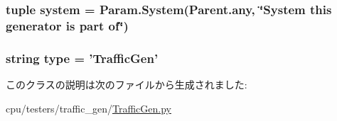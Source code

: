 \label{classTrafficGen_1_1TrafficGen_a1aadf525515ecfcf662c2aa51a503763}
\hypertarget{classTrafficGen_1_1TrafficGen_ab737471139f5a296e5b26e8a0e1b0744}{
\subsubsection[{system}]{\setlength{\rightskip}{0pt plus 5cm}tuple {\bf system} = Param.System(Parent.any, \char`\"{}System this generator is part of\char`\"{})}}
\label{classTrafficGen_1_1TrafficGen_ab737471139f5a296e5b26e8a0e1b0744}
\hypertarget{classTrafficGen_1_1TrafficGen_acce15679d830831b0bbe8ebc2a60b2ca}{
\subsubsection[{type}]{\setlength{\rightskip}{0pt plus 5cm}string {\bf type} = '{\bf TrafficGen}'}}
\label{classTrafficGen_1_1TrafficGen_acce15679d830831b0bbe8ebc2a60b2ca}


このクラスの説明は次のファイルから生成されました:\begin{DoxyCompactItemize}
\item 
cpu/testers/traffic\_\-gen/\hyperlink{TrafficGen_8py}{TrafficGen.py}\end{DoxyCompactItemize}
